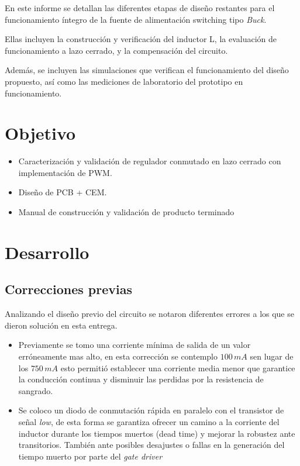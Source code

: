 \documentclass[]{article}
\begin{document}
		En este informe se detallan las diferentes etapas de diseño restantes para el funcionamiento íntegro de la fuente de alimentación switching tipo \textit{Buck}.
		
		Ellas incluyen la construcción y verificación del inductor L, la evaluación de funcionamiento a lazo cerrado, y la compensación del circuito.
		
		Además, se incluyen las simulaciones que verifican el funcionamiento del diseño propuesto, así como las mediciones de laboratorio del prototipo en funcionamiento.
		
		
	\section{Objetivo}
		
		\begin{itemize}
			\item 	Caracterización y validación de regulador conmutado en lazo cerrado con implementación de PWM.
			\item 	Diseño de PCB + CEM.
			\item Manual de construcción y validación de producto terminado 	
		\end{itemize}	
		
	
	\section{Desarrollo}
	
	\subsection{Correcciones previas}
	
	Analizando el diseño previo del circuito se notaron diferentes errores a los que se dieron solución en esta entrega.
	
	\begin{itemize}
		\item Previamente se tomo una corriente mínima de salida de un valor erróneamente mas alto, en esta corrección se contemplo $100\,mA$ sen lugar de los $750\,mA$ esto permitió establecer una corriente media menor que garantice la conducción continua y disminuir las perdidas por la resistencia de sangrado. 
		
		\item Se coloco un diodo de conmutación rápida en paralelo con el transistor de señal \textit{low}, de esta forma se garantiza ofrecer un camino a la corriente del inductor durante los tiempos muertos (dead time) y mejorar la robustez ante transitorios. También ante posibles desajustes o fallas en la generación del tiempo muerto por parte del \textit{gate driver}
		
		
		
		
	\end{itemize}
	
\end{document}
